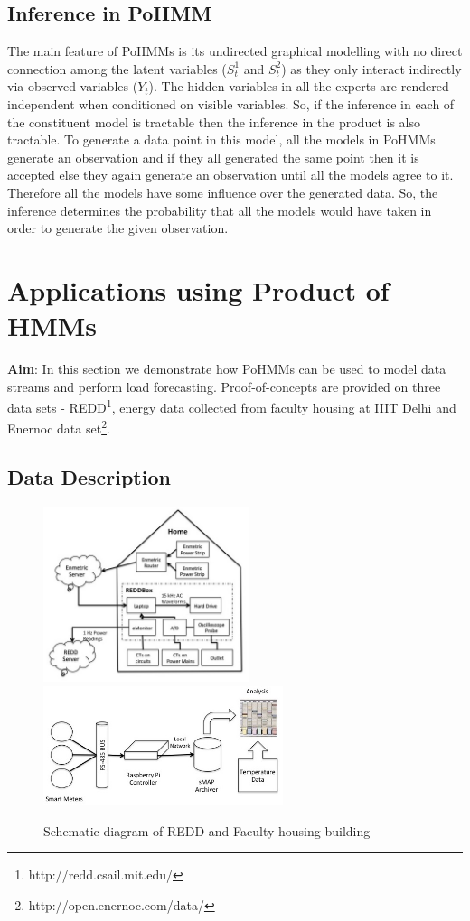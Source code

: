 \documentclass{acm_proc_article-sp}
\begin{document}
 \subsection{Inference in PoHMM}

The main feature of PoHMMs is its undirected graphical modelling with no direct connection among the latent variables ($S^1_{t}$ and $S^2_{t}$) as they only interact indirectly via observed variables ($Y_{t}$). The hidden variables in all the experts are rendered independent when conditioned on visible variables. So, if the inference in each of the constituent model is tractable then the inference in the product is also tractable. To generate a data point in this model, all the models in PoHMMs generate an observation and if they all generated the same point then it is accepted else they again generate an observation until all the models agree to it. Therefore all the models have some influence over the generated data. So, the inference determines the probability that all the models would have taken in order to generate the given observation. 



\section{Applications using Product of HMMs}
\label{poc}

\textbf{Aim}: In this section we demonstrate how PoHMMs can be used to model data streams and perform load forecasting. Proof-of-concepts are provided on three data sets - REDD\footnote{http://redd.csail.mit.edu/}, energy data collected from faculty housing at IIIT Delhi and Enernoc data set\footnote{http://open.enernoc.com/data/}.

\subsection{Data Description} 
\begin{figure}
\centering
\includegraphics[width=6cm]{./REDD_img}
\includegraphics[width=7cm]{./FHschema}
\caption{Schematic diagram of REDD and Faculty housing building}
\label{fig:FH}
\end{figure}
\end{document}
